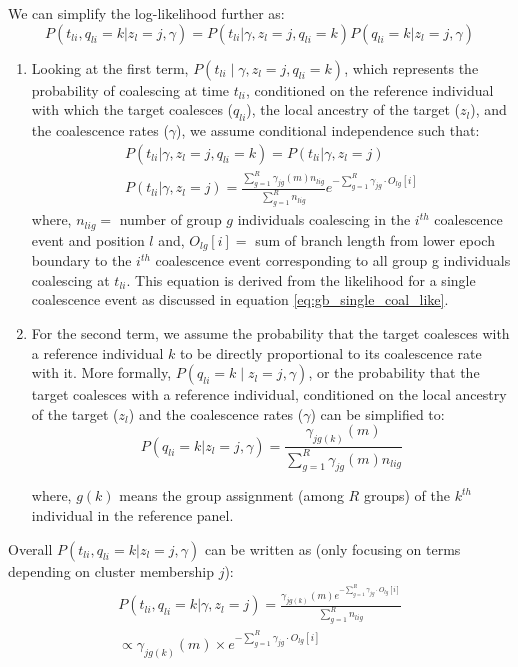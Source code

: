 We can simplify the log-likelihood further as:
\begin{equation}
    P(t_{li}, q_{li} = k | z_l = j, \gamma ) = P(t_{li} | \gamma, z_l = j, q_{li} = k)P(q_{li} = k | z_l = j, \gamma)
\end{equation}

\begin{enumerate}
\item Looking at the first term, $P(t_{li} \mid \gamma, z_l = j, q_{li} = k)$, which represents the probability of coalescing at time $t_{li}$, conditioned on the reference individual with which the target coalesces ($q_{li}$), the local ancestry of the target ($z_l$), and the coalescence rates ($\gamma$), we assume conditional independence such that:
\begin{align}
    P(t_{li} | \gamma, z_l = j, q_{li} = k) = P(t_{li} | \gamma, z_l = j) \nonumber \\
    P(t_{li} | \gamma, z_l = j) = \frac{\sum_{g=1}^R\gamma_{jg}(m)n_{lig}}{\sum_{g=1}^R n_{lig}}e^{-\sum_{g=1}^R \gamma_{jg} \cdot O_{lg}[i]}
\end{align}
where, $n_{lig} =$  number of group $g$ individuals coalescing in the $i^{th}$ coalescence event and position $l$ and, $O_{lg}[i] =$ sum of branch length from lower epoch boundary to the $i^{th}$ coalescence event corresponding to all group g individuals coalescing at $t_{li}$. This equation is derived from the likelihood for a single coalescence event as discussed in equation \ref{eq:gb_single_coal_like}.
\vspace{3mm}
\item For the second term, we assume the probability that the target coalesces with a reference individual $k$ to be directly proportional to its coalescence rate with it. More formally, $P(q_{li} = k \mid z_l = j, \gamma)$, or the probability that the target coalesces with a reference individual, conditioned on the local ancestry of the target ($z_l$) and the coalescence rates ($\gamma$) can be simplified to:
\begin{equation}
    P(q_{li} = k | z_l = j, \gamma) = \frac{\gamma_{jg(k)}(m)}{\sum_{g=1}^R \gamma_{jg}(m)n_{lig}}
\label{eq:qli}
\end{equation}

where, $g(k)$ means the group assignment (among $R$ groups) of the $k^{th}$ individual in the reference panel. 
\end{enumerate}

Overall $P(t_{li}, q_{li} = k | z_l = j, \gamma )$ can be written as (only focusing on terms depending on cluster membership $j$): 
\begin{align}
    P(t_{li}, q_{li} = k | \gamma, z_l = j ) = \frac{\gamma_{jg(k)}(m)e^{-\sum_{g=1}^R \gamma_{jg}\cdot O_{lg}[i]}}{\sum_{g=1}^R n_{lig}} \nonumber \\
    \propto \gamma_{jg(k)}(m) \times e^{-\sum_{g=1}^R \gamma_{jg}\cdot O_{lg}[i]}
    \label{eq:likelihood}
\end{align}

